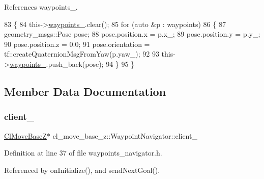 References waypoints\+\_\+.


\begin{DoxyCode}
83 \{
84   this->\hyperlink{classcl__move__base__z_1_1WaypointNavigator_a727f6a73e15ff5dc6bb3ffdf52c3d832}{waypoints\_}.clear();
85   \textcolor{keywordflow}{for} (\textcolor{keyword}{auto} &p : waypoints)
86   \{
87     geometry\_msgs::Pose pose;
88     pose.position.x = p.x\_;
89     pose.position.y = p.y\_;
90     pose.position.z = 0.0;
91     pose.orientation = tf::createQuaternionMsgFromYaw(p.yaw\_);
92 
93     this->\hyperlink{classcl__move__base__z_1_1WaypointNavigator_a727f6a73e15ff5dc6bb3ffdf52c3d832}{waypoints\_}.push\_back(pose);
94   \}
95 \}
\end{DoxyCode}


\subsection{Member Data Documentation}
\mbox{\label{classcl__move__base__z_1_1WaypointNavigator_afc5ad5c5d15f41437286b8fca1d3a324}} 
\subsubsection{\texorpdfstring{client\+\_\+}{client\_}}
{\footnotesize\ttfamily \hyperlink{classcl__move__base__z_1_1ClMoveBaseZ}{Cl\+Move\+BaseZ}$\ast$ cl\+\_\+move\+\_\+base\+\_\+z\+::\+Waypoint\+Navigator\+::client\+\_\+}



Definition at line 37 of file waypoints\+\_\+navigator.\+h.



Referenced by on\+Initialize(), and send\+Next\+Goal().

\mbox{\label{classcl__move__base__z_1_1WaypointNavigator_a82859e418592c2392c20a2d11b9836eb}} 
